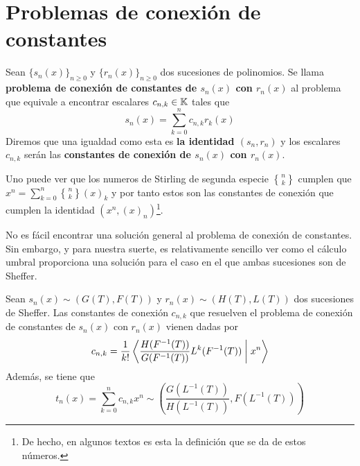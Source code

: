 \section{Problemas de conexión de constantes}

\begin{definicion}
    Sean $\{s_n(x)\}_{n \geq 0}$ y $\{r_n(x)\}_{n \geq 0}$ dos sucesiones de polinomios. Se llama \textbf{problema de conexión de constantes de $s_n(x)$ con $r_n(x)$} al problema que equivale a encontrar escalares $c_{n,k} \in \mathbb{K}$ tales que
    \begin{equation}\label{conexion constantes}
        s_n(x) = \sum_{k=0}^n c_{n,k}r_k(x)
    \end{equation} 
    Diremos que una igualdad como esta es \textbf{la identidad $(s_n, r_n)$} y los escalares $c_{n,k}$ serán las \textbf{constantes de conexión de $s_n(x)$ con $r_n(x)$}. 
\end{definicion}

\begin{ej}
    Uno puede ver que los numeros de Stirling de segunda especie ${n \brace k}$ cumplen que $x^n = \sum_{k=0}^n {n \brace k}(x)_k$ y por tanto estos son las constantes de conexión que cumplen la identidad $(x^n, (x)_n)$\footnote{De hecho, en algunos textos es esta la definición que se da de estos números.}.
\end{ej}

No es fácil encontrar una solución general al problema de conexión de constantes. Sin embargo, y para nuestra suerte, es relativamente sencillo ver como el cálculo umbral proporciona una solución para el caso en el que ambas sucesiones son de Sheffer.

\begin{teorema}
    Sean $s_n(x) \sim (G(T), F(T))$ y $r_n(x) \sim (H(T), L(T))$ dos sucesiones de Sheffer. Las constantes de conexión $c_{n,k}$ que resuelven el problema de conexión de constantes de $s_n(x)$ con $r_n(x)$ vienen dadas por
    \begin{equation*}
        c_{n,k} = \frac{1}{k!} \left\langle \frac{H(F^{-1}(T))}{G(F^{-1}(T))} L^k(F^{-1}(T)) \biggm| x^n \right\rangle
    \end{equation*}
    Además, se tiene que
    \begin{equation*}
        t_n(x) = \sum_{k=0}^n c_{n,k}x^n \sim \left(\frac{G(L^{-1}(T))}{H(L^{-1}(T))}, F(L^{-1}(T))\right)
    \end{equation*}
\end{teorema}

